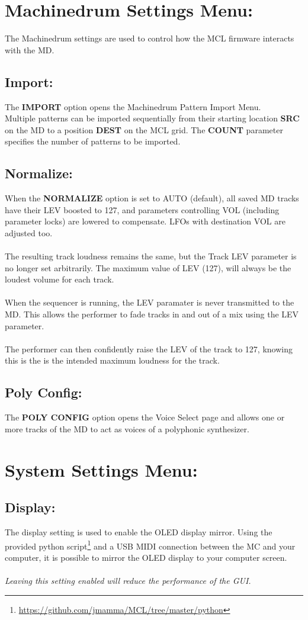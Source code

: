 \chapter{Machinedrum Settings Menu:}
The Machinedrum settings are used to control how the MCL firmware interacts with the MD.
\section{Import:}
The \textbf{IMPORT} option opens the Machinedrum Pattern Import Menu.\\ 
Multiple patterns can be imported sequentially from their starting location \textbf{SRC} on the MD to a position \textbf{DEST} on the MCL grid. The \textbf{COUNT} parameter specifies the number of patterns to be imported.
\section{Normalize:}
When the \textbf{NORMALIZE} option is set to AUTO (default), all saved MD tracks have their LEV boosted to 127, and parameters controlling VOL (including parameter locks) are lowered
to compensate. LFOs with destination VOL are 
adjusted too.\\
\\
The resulting track loudness remains the same, but the Track LEV parameter is no longer set arbitrarily. The maximum value of LEV (127), will always be the loudest volume for each track.\\
\\
When the sequencer is running, the LEV paramater is never transmitted to the MD. This allows the performer to fade tracks in and out of a mix using the LEV parameter.\\
\\
The performer can then confidently raise the LEV of the track to 127, knowing this is the is the intended maximum loudness for the track.
\section{Poly Config:}
The \textbf{POLY CONFIG} option opens the Voice Select page and allows one or more tracks of the MD to act as voices of a polyphonic synthesizer.

\chapter{System Settings Menu:}

\section{Display:}
The display setting is used to enable the OLED display mirror. Using the provided python script\footnote{\url{https://github.com/jmamma/MCL/tree/master/python}} and a USB MIDI connection between the MC and your computer, it is possible to mirror the OLED display to your computer screen.\\
\\
\textit{Leaving this setting enabled will reduce the performance of the GUI.}

